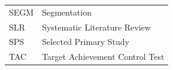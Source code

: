 \documentclass[sensors,review,accept,moreauthors,pdftex]{Definitions/mdpi}
\begin{document}
{\noindent 
\begin{tabular}{@{}ll}
%	
%
SEGM&Segmentation\\
SLR & Systematic Literature Review\\
SPS & Selected Primary Study \\
TAC& Target Achievement Control Test




\end{tabular}
}


\end{document}
